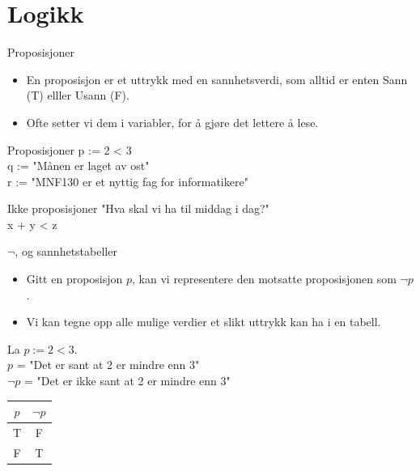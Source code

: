 
\section{Logikk}
\begin{frame}{Proposisjoner}
\begin{itemize}
    \item En proposisjon er et uttrykk med en sannhetsverdi, som alltid er enten Sann (T) elller Usann (F).
    \item Ofte setter vi dem i variabler, for å gjøre det lettere å lese.
\end{itemize}
\begin{block}{Proposisjoner}
    p := 2 < 3 \\
    q := "Månen er laget av ost"\\
    r := "MNF130 er et nyttig fag for informatikere"
\end{block}
\begin{block}{Ikke proposisjoner}
    "Hva skal vi ha til middag i dag?"\\
    x + y < z
\end{block}
\end{frame}

\begin{frame}{$\lnot$, og sannhetstabeller}
\begin{itemize}
    \item Gitt en proposisjon $p$, kan vi representere den motsatte proposisjonen som $\lnot p$.
    \item Vi kan tegne opp alle mulige verdier et slikt uttrykk kan ha i en tabell.
\end{itemize}

\begin{block}
    La $p := 2 < 3$. \\
    $p$ = "Det er sant at 2 er mindre enn 3" \\
    $\lnot p$ = "Det er ikke sant at 2 er mindre enn 3"
\end{block}
\begin{tabular}{c|c}
$p$ & $\lnot p$ \\ \hline
T & F \\
F & T \\ \hline
\end{tabular}
\end{frame}

